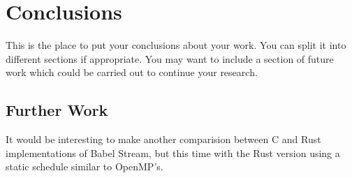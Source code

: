 \chapter{Conclusions}

This is the place to put your conclusions about your work. You can
split it into different sections if appropriate. You may want to include
a section of future work which could be carried out to continue your
research.

\section{Further Work}
It would be interesting to make another comparision between C and Rust implementations of Babel Stream, but this time with the Rust version using a static schedule similar to OpenMP's.
